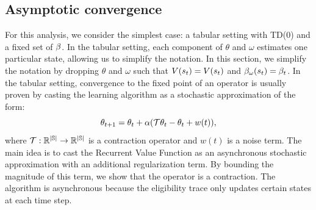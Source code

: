 \subsection*{Asymptotic convergence}
For this analysis, we consider the simplest case: a tabular setting with TD(0) and a fixed set of $\beta$. In the tabular setting, each component of $\theta$ and $\omega$ estimates one particular state, allowing us to simplify the notation. In this section, we simplify the notation by dropping $\theta$ and $\omega$ such that $V(s_t) = V(s_t)$ and $\beta_{\omega}(s_t) = \beta_t$.
In the tabular setting, convergence to the fixed point of an operator is usually proven by casting the learning algorithm as a stochastic approximation \cite{tsitsiklis1994asynchronous,borkar2009stochastic,borkar2000ode} of the form:
\begin{equation}\label{stoch}
    \theta_{t+1} = \theta_t + \alpha( \mathcal{T} \theta_t  - \theta_t + w(t)), 
\end{equation}
where $\mathcal{T}: \mathbb{R^{|\mathbb{S}|}} \rightarrow \mathbb{R^{|\mathbb{S}|}}$ is a contraction operator and $w(t)$ is a noise term. 
The main idea is to cast the Recurrent Value Function as an asynchronous stochastic approximation \cite{tsitsiklis1994asynchronous} with an additional regularization term. By bounding the magnitude of this term, we show that the operator is a contraction. The algorithm is asynchronous because the eligibility trace only updates certain states at each time step. 

